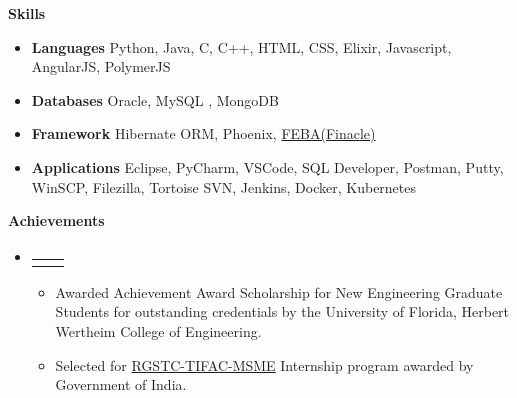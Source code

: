 \documentclass[letterpaper,12pt]{article}[leftmargin=*]
\makeatletter
\def \entryspacing {-2pt}
\def \entryspacingnew {-4pt}
\renewcommand{\section}[2]{\vspace{5pt}
  \colorbox{secondary}{\color{white}\raggedbottom\normalsize\textbf{{#1}{\hspace{7pt}#2}}}
}
\newcommand{\resumeEntryStart}{\begin{itemize}[leftmargin=2.5mm]\vspace{\entryspacingnew}}
\newcommand{\resumeEntryEnd}{\end{itemize}\vspace{\entryspacingnew}}
\newcommand{\resumeItemListStart}{\begin{itemize}[leftmargin=4.5mm]}
\newcommand{\resumeItemListEnd}{\end{itemize}\vspace{\entryspacing}}
\newcommand{\resumeItem}[1]{
  \item\small{
    {#1 \vspace{-2pt}}
  }
}
\newcommand{\resumeEntryTD}[2]{
  \vspace{-1pt}\item[]
    \begin{tabular*}{0.97\textwidth}{l@{\extracolsep{\fill}}r}
      \textbf{\color{primary}#1} & {\firabook\color{accent}\small#2} \\
    \end{tabular*}\vspace{-10pt}
}
\newcommand{\resumeEntryS}[2]{
  \item[]\small{
    \textbf{\color{primary}#1 }{ #2 \vspace{-6pt}}
  }
}
\makeatother
\begin{document}
  
 
   
 


\vspace{3pt}
\hspace{-15pt}\section{\faGears}{Skills}
 \resumeEntryStart
  \resumeEntryS{Languages } {Python, Java, C, C++, HTML, CSS, Elixir, Javascript, AngularJS, PolymerJS}
  \resumeEntryS{Databases } {Oracle, MySQL , MongoDB}
  \resumeEntryS{Framework } {Hibernate ORM, Phoenix, \href{https://www.edgeverve.com/finacle/
}{ FEBA(Finacle)}}
  \resumeEntryS{Applications } {Eclipse, PyCharm, VSCode,  SQL Developer, Postman, Putty, WinSCP, Filezilla, Tortoise SVN, Jenkins, Docker, Kubernetes }
 \resumeEntryEnd
\vspace{8pt}

\hspace{-15pt}\section{\faTrophy}{Achievements}

   \resumeEntryStart
   \vspace{-10pt}
   \resumeEntryTD
      {}{}
    \resumeItemListStart
    
      \resumeItem {Awarded Achievement Award Scholarship for New Engineering Graduate Students for outstanding credentials  by the University of Florida, Herbert Wertheim College of Engineering.}
      
      \resumeItem{Selected for \href{http://www.rknec.edu/IIIC/Internship.aspx}{RGSTC-TIFAC-MSME} Internship program awarded by Government of India.}
    \resumeItemListEnd
  \resumeEntryEnd
\end{document}
